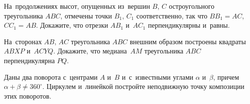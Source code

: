 \begin{problems}
\item
На~продолжениях высот, опущенных из~вершин $B$, $C$ остроугольного треугольника
$ABC$, отмечены точки $B_1$, $C_1$ соответственно, так что
$B B_1 = AC$, $C C_1 = AB$.
Докажите, что отрезки $A B_1$ и~$A C_1$ перпендикулярны и~равны.

\item
На~сторонах $AB$, $AC$ треугольника $ABC$ внешним образом построены квадраты
$ABXP$ и~$ACYQ$.
Докажите, что медиана~$AM$ треугольника $ABC$ перпендикулярна $PQ$.

\item
Даны два поворота с~центрами $A$ и~$B$ и~с~известными углами $\alpha$
и~$\beta$, причем $\alpha + \beta \neq 360^{\circ}$.
Циркулем и~линейкой постройте неподвижную точку композиции этих поворотов.

\end{problems}

